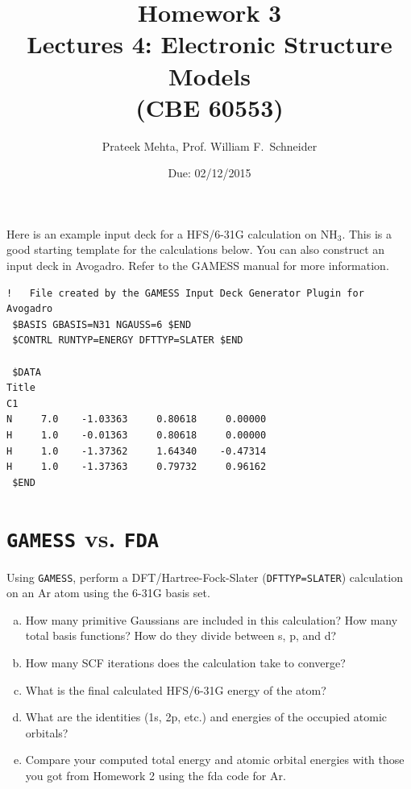 \documentclass[11pt]{article}
\date{Due: 02/12/2015}
\title{}
\begin{document}
\title{Homework 3\\Lectures 4: Electronic Structure Models\\(CBE 60553)}
\author{Prateek Mehta, Prof. William F.\ Schneider}
\maketitle


Here is an example input deck for a HFS/6-31G calculation on NH$_{\text{3}}$. This is a good starting template for the calculations below. You can also construct an input deck in Avogadro. Refer to the GAMESS manual for more information.

\begin{verbatim}
!   File created by the GAMESS Input Deck Generator Plugin for Avogadro
 $BASIS GBASIS=N31 NGAUSS=6 $END
 $CONTRL RUNTYP=ENERGY DFTTYP=SLATER $END

 $DATA 
Title
C1
N     7.0    -1.03363     0.80618     0.00000
H     1.0    -0.01363     0.80618     0.00000
H     1.0    -1.37362     1.64340    -0.47314
H     1.0    -1.37363     0.79732     0.96162
 $END
\end{verbatim}


\section{\texttt{GAMESS} vs. \texttt{FDA}}
\label{sec-1}

Using \texttt{GAMESS}, perform a DFT/Hartree-Fock-Slater (\verb~DFTTYP=SLATER~) calculation on an Ar atom using the 6-31G basis set.

\begin{enumerate}[(a)]
\item How many primitive Gaussians are included in this calculation? How many total basis functions? How do they divide between s, p, and d?

\item How many SCF iterations does the calculation take to converge?

\item What is the final calculated HFS/6-31G energy of the atom?

\item What are the identities (1s, 2p, etc.) and energies of the occupied atomic orbitals?

\item Compare your computed total energy and atomic orbital energies with those you got from Homework 2 using the fda code for Ar.
\end{enumerate}
\end{document}
